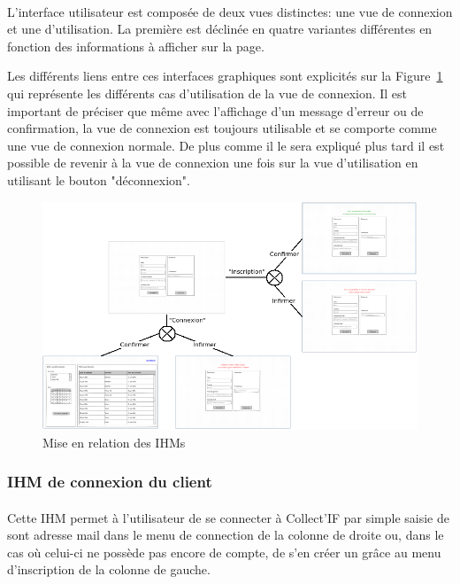 \documentclass[a4paper,11pt]{article}
\begin{document}
\paragraph{}
L'interface utilisateur est composée de deux vues distinctes: une vue de connexion et une d'utilisation. La première est déclinée en quatre variantes différentes en fonction des informations à afficher sur la page.

Les différents liens entre ces interfaces graphiques sont explicités sur la Figure~\ref{IHMs} qui représente les différents cas d'utilisation de la vue de connexion. Il est important de préciser que même avec l'affichage d'un message d'erreur ou de confirmation, la vue de connexion est toujours utilisable et se comporte comme une vue de connexion normale. De plus comme il le sera expliqué plus tard il est possible de revenir à la vue de connexion une fois sur la vue d'utilisation en utilisant le bouton "déconnexion".

\begin{figure}[H]
  \begin{center}
    \includegraphics[width=15cm]{../../IHM/graphique_IHM.png}
    \caption{Mise en relation des IHMs}
    \label{IHMs}
  \end{center}
\end{figure}
\pagebreak
\subsubsection{IHM de connexion du client}

\paragraph{}
Cette IHM permet à l'utilisateur de se connecter à Collect'IF par simple saisie de sont adresse mail dans le menu de connection de la colonne de droite ou, dans le cas où celui-ci ne possède pas encore de compte, de s'en créer un grâce au menu d'inscription de la colonne de gauche.
\end{document}
